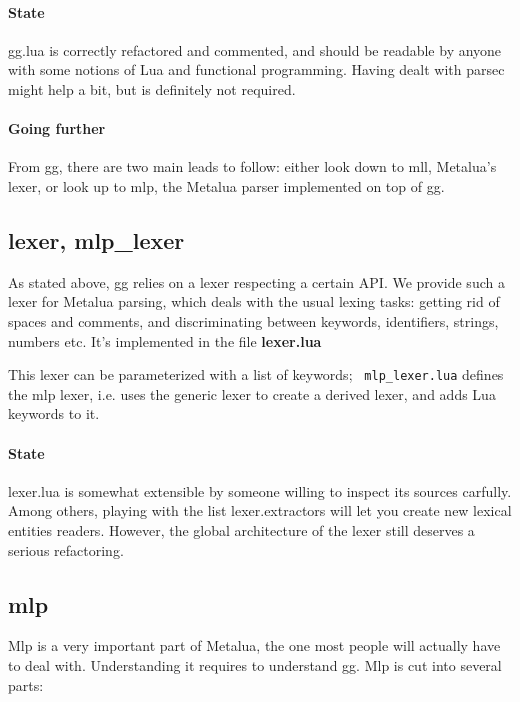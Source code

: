 \paragraph{State} 
gg.lua is correctly refactored and commented, and should be readable
by anyone with some notions of Lua and functional programming. Having
dealt with parsec might help a bit, but is definitely not required.

\paragraph{Going further} 
From gg, there are two main leads to follow: either look down to mll,
Metalua's lexer, or look up to mlp, the Metalua parser implemented on
top of gg.

\subsection{lexer, mlp\_lexer}

As stated above, gg relies on a lexer respecting a certain API. We
provide such a lexer for Metalua parsing, which deals with the usual
lexing tasks: getting rid of spaces and comments, and discriminating
between keywords, identifiers, strings, numbers etc. It's implemented
in the file {\bf lexer.lua}

This lexer can be parameterized with a list of keywords; {\tt
  mlp\_lexer.lua} defines the mlp lexer, i.e. uses the generic lexer to
create a derived lexer, and adds Lua keywords to it. 

\paragraph{State}
lexer.lua is somewhat extensible by someone willing to inspect its
sources carfully. Among others, playing with the list lexer.extractors
will let you create new lexical entities readers. However, the global
architecture of the lexer still deserves a serious refactoring.

\subsection{mlp}
Mlp is a very important part of Metalua, the one most people will
actually have to deal with. Understanding it requires to understand
gg. Mlp is cut into several parts:

